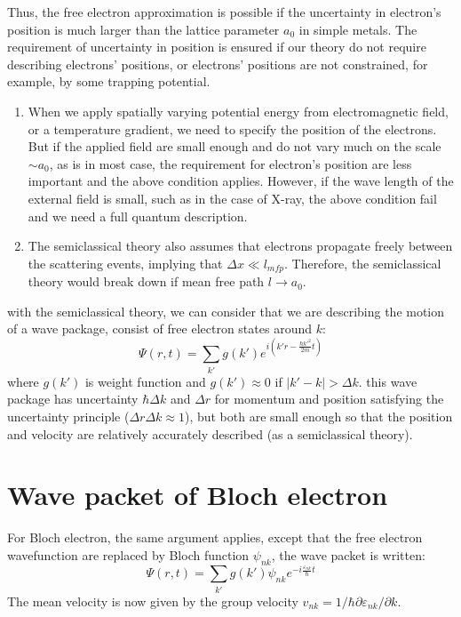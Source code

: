 \documentclass{article}
\begin{document}
Thus, the free electron approximation is possible if the uncertainty in electron's position is much 
larger than the lattice parameter $a_0$ in simple metals. The requirement of uncertainty in position is ensured 
if our theory do not require describing electrons' positions, or electrons' positions are not 
constrained, for example, by some trapping potential.
\begin{enumerate}
    \item When we apply spatially varying potential energy from electromagnetic field, or a temperature gradient, we 
            need to specify the position of the electrons. But if the applied field are small enough and do not vary
            much on the scale $\sim a_0$, as is in most case, the requirement for electron's position are 
            less important and the above condition applies. However, if the wave length of the external field is small, such 
            as in the case of X-ray, the above condition fail and we need a full quantum description. 
    \item The semiclassical theory also assumes that electrons propagate freely between the scattering events, implying that 
            $\Delta x \ll l_{mfp}$. Therefore, the semiclassical theory would break down if mean free path $l \to a_0$.
\end{enumerate}

with the semiclassical theory, we can consider that we are describing the motion of a wave package, consist of 
free electron states around $k$:
\begin{equation}
    \varPsi(r,t) = \sum_{k'} g(k') e^{i(k'r - \frac{\hbar k'^2}{2m}t)} \label{free electron}
\end{equation}
where $g(k')$ is weight function and $g(k') \approx 0$ if $|k'-k| > \Delta k$. 
this wave package has uncertainty $\hbar \Delta k$ and $\Delta r$
for momentum and position satisfying the uncertainty principle ($\Delta r \Delta k \approx 1$), but both are small enough so that the 
position and velocity are relatively accurately described (as a semiclassical theory). 

\section{Wave packet of Bloch electron}
For Bloch electron, the same argument applies, except that the free electron wavefunction are 
replaced by Bloch function $\psi_{nk}$, the wave packet is written:
\begin{equation}
    \varPsi(r,t) = \sum_{k'} g(k') \psi_{nk} e^{-i\frac{\varepsilon_{nk}}{\hbar}t}
\end{equation}
The mean velocity is now given by the group velocity $v_{nk} = 1/\hbar \partial \varepsilon_{nk}/\partial k$.
\end{document}
